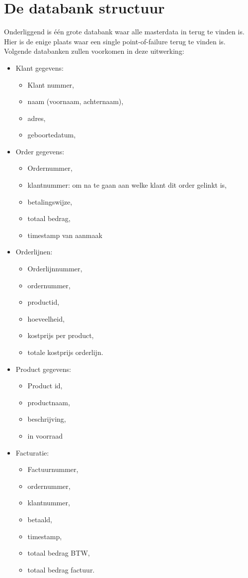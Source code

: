 \section{De databank structuur}
Onderliggend is één grote databank waar alle masterdata in terug te vinden is. Hier is de enige plaats waar een single point-of-failure terug te vinden is. 
Volgende databanken zullen voorkomen in deze uitwerking:
\begin{itemize}
	\item Klant gegevens:
		\begin{itemize}
			\item Klant nummer,
			\item naam (voornaam, achternaam),
			\item adres,
			\item geboortedatum,
		\end{itemize}
	\item Order gegevens:
		\begin{itemize}
			\item Ordernummer,
			\item klantnummer: om na te gaan aan welke klant dit order gelinkt is,
			\item betalingswijze,
			\item totaal bedrag,
			\item timestamp van aanmaak
		\end{itemize}
	\item Orderlijnen:
		\begin{itemize}
			\item Orderlijnnummer,
			\item ordernummer,
			\item productid,
			\item hoeveelheid,
			\item kostprijs per product,
			\item totale kostprijs orderlijn.
		\end{itemize}
	\item Product gegevens:
		\begin{itemize}
			\item Product id,
			\item productnaam,
			\item beschrijving,
			\item in voorraad
		\end{itemize}
	\item Facturatie:
		\begin{itemize}
			\item Factuurnummer,
			\item ordernummer,
			\item klantnummer,
			\item betaald,
			\item timestamp,
			\item totaal bedrag BTW,
			\item totaal bedrag factuur.
		\end{itemize}
\end{itemize}

